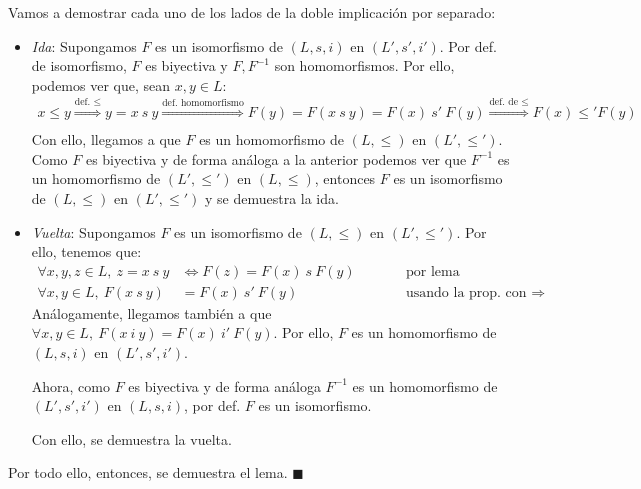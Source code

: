 \documentclass{article}
\begin{document}
\vspace{0.5cm}
Vamos a demostrar cada uno de los lados de la doble implicación por separado:
\begin{itemize}
  \item \textit{Ida}: Supongamos $F$ es un isomorfismo de $(L,s,i)$ en $(L',s',i')$. Por def. de isomorfismo, $F$ es biyectiva y $F,F^{-1}$ son homomorfismos. Por ello, podemos ver que, sean $x,y\in L$:
        \begin{equation*}
          \begin{aligned}
            x\leq y\overset{\text{def. }\leq}{\Rightarrow}y=x\ s\ y\overset{\text{def. homomorfismo}}{\Rightarrow}F(y)=F(x\ s\ y)=F(x)\ s'\ F(y)\overset{\text{def. de }\leq}{\Rightarrow}F(x)\leq' F(y) \\
          \end{aligned}
        \end{equation*}
        Con ello, llegamos a que $F$ es un homomorfismo de $(L,\leq)$ en $(L',\leq')$. Como $F$ es biyectiva y de forma análoga a la anterior podemos ver que $F^{-1}$ es un homomorfismo de $(L',\leq')$ en $(L,\leq)$, entonces $F$ es un isomorfismo de $(L,\leq)$ en $(L',\leq')$ y se demuestra la ida.
  \item \textit{Vuelta}: Supongamos $F$ es un isomorfismo de $(L,\leq)$ en $(L',\leq')$. Por ello, tenemos que:
        \begin{equation*}
          \begin{alignedat}{2}
            \forall x,y,z\in L,\ z=x\ s\ y & \iff F(z)=F(x)\ s\ F(y) &  & \qquad\text{por lema}                        \\
            \forall x,y\in L,\ F(x\ s\ y)  & =F(x)\ s'\ F(y)         &  & \qquad\text{usando la prop. con }\Rightarrow
          \end{alignedat}
        \end{equation*}
        Análogamente, llegamos también a que $\forall x,y\in L,\ F(x\ i\ y) = F(x)\ i'\ F(y)$. Por ello, $F$ es un homomorfismo de $(L,s,i)$ en $(L',s',i')$.

        Ahora, como $F$ es biyectiva y de forma análoga $F^{-1}$ es un homomorfismo de $(L',s',i')$ en $(L,s,i)$, por def. $F$ es un isomorfismo.

        Con ello, se demuestra la vuelta.
\end{itemize}

Por todo ello, entonces, se demuestra el lema. $\blacksquare$
\end{document}
